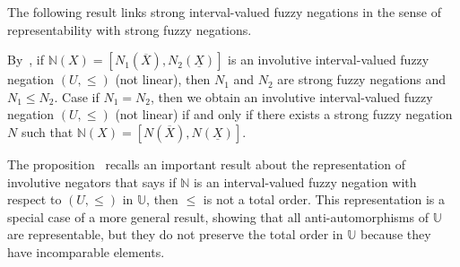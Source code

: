 \documentclass[conference]{IEEEtran}
\theoremstyle{plain}
\theoremstyle{remark}
\theoremstyle{definition}
\theoremstyle{proposition}
\begin{document}
The following result links strong interval-valued fuzzy negations in the sense of representability with strong fuzzy negations. 

By~\cite{bedregal2010interval},
if $\mathbb{N}(X) = [N_{1}(\overline{X}), N_{2}(\underline{X})]$ is an involutive interval-valued fuzzy negation $(U,\le)$ (not linear), then $N_{1}$ and $N_{2}$ are strong fuzzy negations and $N_{1} \le N_{2}$.
Case if $N_{1} = N_{2}$, then we obtain
an involutive interval-valued fuzzy negation $(U,\le)$ (not linear) if and only if there exists a strong fuzzy negation $N$ such that $\mathbb{N}(X) = [N(\overline{X}), N(\underline{X})]$.

The proposition~\cite[Prop. 1]{NEG1} recalls an important result about the representation
of involutive negators that says 
if $\mathbb{N}$ is an interval-valued fuzzy negation with respect to $(U,\le)$ in $\mathbb{U}$, then $\le$ is not a total order.
This representation is a special case of a more general result, showing that all anti-automorphisms of $\mathbb{U}$ are representable, but they do not preserve the total order in $\mathbb{U}$ because they have incomparable elements.




\end{document}
